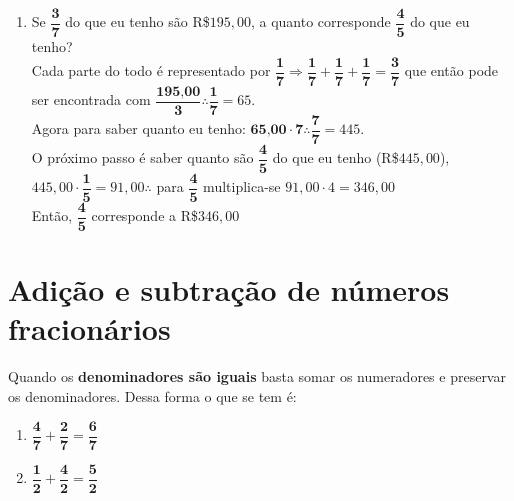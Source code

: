 \begin{enumerate}
	\item Se $\dfrac{\textbf{3}}{\textbf{7}}$ do que eu tenho são R\$$195,00$, a quanto corresponde $\dfrac{\textbf{4}}{\textbf{5}}$ do que eu tenho? \\ Cada parte do todo é representado por $\dfrac{\textbf{1}}{\textbf{7}} \Rightarrow \dfrac{\textbf{1}}{\textbf{7}} + \dfrac{\textbf{1}}{\textbf{7}} + \dfrac{\textbf{1}}{\textbf{7}} = \dfrac{\textbf{3}}{\textbf{7}}$ que então pode ser encontrada com $\dfrac{\textbf{195,00}}{\textbf{3}} \therefore \dfrac{\textbf{1}}{\textbf{7}} = 65$. \\
	Agora para saber quanto eu tenho: $\textbf{65,00}\cdot\textbf{7} \therefore \dfrac{\textbf{7}}{\textbf{7}} = 445$. \\
	O próximo passo é saber quanto são $\dfrac{\textbf{4}}{\textbf{5}}$ do que eu tenho (R\$$445,00$), \\
	$445,00\cdot\dfrac{\textbf{1}}{\textbf{5}} = 91,00 \therefore $ para $\dfrac{\textbf{4}}{\textbf{5}}$ multiplica-se $91,00\cdot4 = 346,00$ \\
	Então, $\dfrac{\textbf{4}}{\textbf{5}}$ corresponde a R\$$346,00$
	
\end{enumerate}

	\section{Adição e subtração de números fracionários}
	
	Quando os \textbf{denominadores são iguais} basta somar os numeradores e preservar os denominadores.
	Dessa forma o que se tem é:
		\begin{enumerate}[label=\alph*)]
			\item $\dfrac{\textbf{4}}{\textbf{7}} + \dfrac{\textbf{2}}{\textbf{7}} = \dfrac{\textbf{6}}{\textbf{7}}$
			\item $\dfrac{\textbf{1}}{\textbf{2}} + \dfrac{\textbf{4}}{\textbf{2}} = \dfrac{\textbf{5}}{\textbf{2}}$
		\end{enumerate}
	

